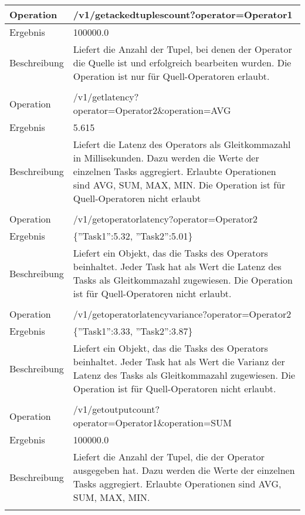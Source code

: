 \begin{longtable}{|p{2cm}|p{12cm}|}
Operation & /v1/getackedtuplescount?operator=Operator1 \\ \hline
Ergebnis & 100000.0 \\ \hline
Beschreibung & Liefert die Anzahl der Tupel, bei denen der Operator die Quelle ist und erfolgreich bearbeiten wurden. Die Operation ist nur für Quell-Operatoren erlaubt.  \\ \hline
\multicolumn{2}{|l|}{} \\ \hline

Operation & /v1/getlatency?operator=Operator2\&operation=AVG \\ \hline
Ergebnis & 5.615 \\ \hline
Beschreibung & Liefert die Latenz des Operators als Gleitkommazahl in Millisekunden. Dazu werden die Werte der einzelnen Tasks aggregiert. Erlaubte Operationen sind AVG, SUM, MAX, MIN. Die Operation ist für Quell-Operatoren nicht erlaubt \\ \hline
\multicolumn{2}{|l|}{} \\ \hline

Operation & /v1/getoperatorlatency?operator=Operator2 \\ \hline
Ergebnis & \{''Task1'':5.32, ''Task2'':5.01\} \\ \hline
Beschreibung & Liefert ein Objekt, das die Tasks des Operators beinhaltet. Jeder Task hat als Wert die Latenz des Tasks als Gleitkommazahl zugewiesen. Die Operation ist für Quell-Operatoren nicht erlaubt. \\ \hline
\multicolumn{2}{|l|}{} \\ \hline

Operation & /v1/getoperatorlatencyvariance?operator=Operator2 \\ \hline
Ergebnis & \{''Task1'':3.33, ''Task2'':3.87\} \\ \hline
Beschreibung & Liefert ein Objekt, das die Tasks des Operators beinhaltet. Jeder Task hat als Wert die Varianz der Latenz des Tasks als Gleitkommazahl zugewiesen. Die Operation ist für Quell-Operatoren nicht erlaubt. \\ \hline
\multicolumn{2}{|l|}{} \\ \hline

Operation & /v1/getoutputcount?operator=Operator1\&operation=SUM \\ \hline
Ergebnis & 100000.0 \\ \hline
Beschreibung & Liefert die Anzahl der Tupel, die der Operator ausgegeben hat. Dazu werden die Werte der einzelnen Tasks aggregiert. Erlaubte Operationen sind AVG, SUM, MAX, MIN. \\ \hline
\multicolumn{2}{|l|}{} \\ \hline


\end{longtable}
